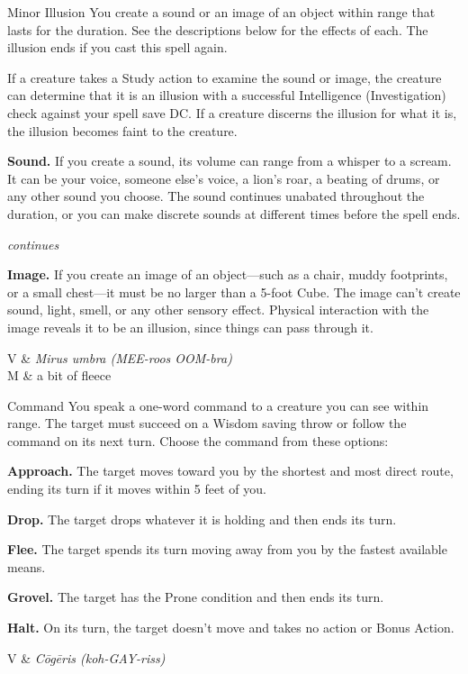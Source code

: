 \begin{Spell}[
    level=Cantrip,
    time=1 Action,
    range=30 ft/5 ft cube,
    components={S, M},
    duration=1 Minute,
    school=Illusion,
    attack=None,
    effect=Control
]{Minor Illusion}
You create a sound or an image of an object within range that lasts for the duration. See the descriptions below for the effects of each. The illusion ends if you cast this spell again.

If a creature takes a Study action to examine the sound or image, the creature can determine that it is an illusion with a successful Intelligence (Investigation) check against your spell save DC. If a creature discerns the illusion for what it is, the illusion becomes faint to the creature.

\textbf{Sound.} If you create a sound, its volume can range from a whisper to a scream. It can be your voice, someone else's voice, a lion's roar, a beating of drums, or any other sound you choose. The sound continues unabated throughout the duration, or you can make discrete sounds at different times before the spell ends.

\hfill \textit{\footnotesize continues}
\newpage
{}

\textbf{Image.} If you create an image of an object---such as a chair, muddy footprints, or a small chest---it must be no larger than a 5-foot Cube. The image can't create sound, light, smell, or any other sensory effect. Physical interaction with the image reveals it to be an illusion, since things can pass through it.

\begin{components}
V & \textit{Mirus umbra (MEE-roos OOM-bra)} \\
M & a bit of fleece
\end{components}
\end{Spell}


\begin{Spell}[
    level=1st,
    time=1 Action,
    range=60 ft,
    components={V},
    duration=Instantaneous,
    school=Enchantment,
    attack=WIS,
    effect=Prone
]{Command}
You speak a one-word command to a creature you can see within range. The target must succeed on a Wisdom saving throw or follow the command on its next turn. Choose the command from these options:

\textbf{Approach.} The target moves toward you by the shortest and most direct route, ending its turn if it moves within 5 feet of you.

\textbf{Drop.} The target drops whatever it is holding and then ends its turn.

\textbf{Flee.} The target spends its turn moving away from you by the fastest available means.

\textbf{Grovel.} The target has the Prone condition and then ends its turn.

\textbf{Halt.} On its turn, the target doesn't move and takes no action or Bonus Action.

\begin{components}
V & \textit{C\=og\=eris (koh-GAY-riss)}
\end{components}
\end{Spell}


